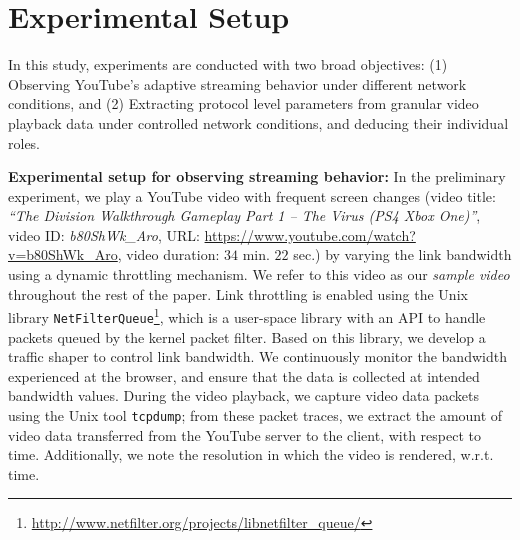 \section{Experimental Setup}
\label{chap03sec:experiments}

In this study, experiments are conducted with two broad objectives: (1) Observing YouTube's adaptive streaming behavior under different network conditions, and (2) Extracting protocol level parameters from granular video playback data under controlled network conditions, and deducing their individual roles.

{\bf Experimental setup for observing streaming behavior:} In the preliminary experiment, we play a YouTube video with frequent screen changes (video title: {\em ``The Division Walkthrough Gameplay Part 1 -- The Virus (PS4 Xbox One)''}, video ID: {\em b80ShWk\_Aro}, URL: \url{https://www.youtube.com/watch?v=b80ShWk_Aro}, video duration: $34$ min. $22$ sec.) by varying the link bandwidth using a dynamic throttling mechanism.
We refer to this video as our {\it sample video} throughout the rest of the paper.
Link throttling is enabled using the Unix library \texttt{NetFilterQueue}\footnote{\url{http://www.netfilter.org/projects/libnetfilter_queue/}}, which is a user-space library with an API to handle packets queued by the kernel packet filter.
Based on this library, we develop a traffic shaper to control link bandwidth.
We continuously monitor the bandwidth experienced at the browser, and ensure that the data is collected at intended bandwidth values.
During the video playback, we capture video data packets using the Unix tool \texttt{tcpdump}; from these packet traces, we extract the amount of video data transferred from the YouTube server to the client, with respect to time.
Additionally, we note the resolution in which the video is rendered, w.r.t. time.

